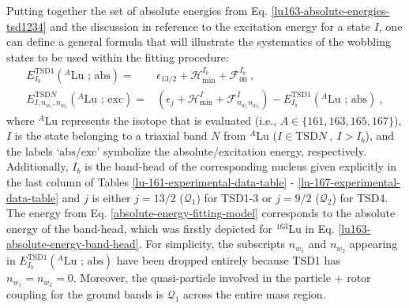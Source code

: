 Putting together the set of absolute energies from Eq. \ref{lu163-absolute-energies-tsd1234} and the discussion in reference to the excitation energy for a state $I$, one can define a general formula that will illustrate the systematics of the wobbling states to be used within the fitting procedure:
\begin{align}
    E_{I_b}^\text{TSD1}(^A\text{Lu\ ;\ abs})=&\epsilon_{13/2}+\mathcal{H}_\text{min}^{I_b}+\mathcal{F}_{00}^{I_b}\ ,\label{absolute-energy-fitting-model}\\
    E_{I,n_{w_1},n_{w_2}}^{\text{TSD}N}(^A\text{Lu\ ;\ exc})=&\left(\epsilon_{j}+\mathcal{H}_\text{min}^I+\mathcal{F}^I_{n_{w_1}n_{w_2}}\right)-E_{I_b}^\text{TSD1}(^A\text{Lu\ ;\ abs})\ ,
    \label{general-excitation-energy-fitting-model}
\end{align}
where $^A$Lu represents the isotope that is evaluated (i.e., $A\in\{161,163,165,167\}$), $I$ is the state belonging to a triaxial band $N$ from $^A$Lu ($I\in\text{TSD}N\ ,\ I>I_b$), and the labels `$\text{abs}$/$\text{exc}$' symbolize the absolute/excitation energy, respectively. Additionally, $I_b$ is the band-head of the corresponding nucleus given explicitly in the last column of Tables \ref{lu-161-experimental-data-table} - \ref{lu-167-experimental-data-table} and $j$ is either $j=13/2$ ($\mathcal{Q}_1$) for TSD1-3 or $j=9/2$ ($\mathcal{Q}_2$) for TSD4. The energy from Eq. \ref{absolute-energy-fitting-model} corresponds to the absolute energy of the band-head, which was firstly depicted for $^{163}$Lu in Eq. \ref{lu163-absolute-energy-band-head}. For simplicity, the subscripts $n_{w_1}$ and $n_{w_2}$ appearing in $E_{I_b}^\text{TSD1}(^A\text{Lu\ ;\ abs})$ have been dropped entirely because TSD1 has $n_{w_1}=n_{w_2}=0$. Moreover, the quasi-particle involved in the particle + rotor coupling for the ground bands is $\mathcal{Q}_1$ across the entire mass region.

